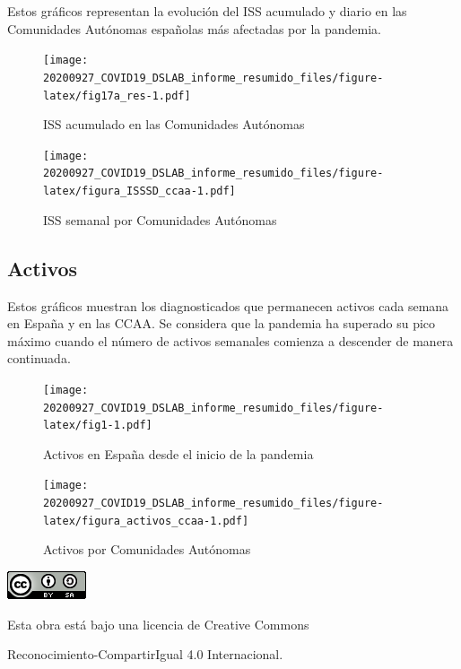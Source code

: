 \documentclass[
  11pt,
]{article}
\begin{document}
Estos gráficos representan la evolución del ISS acumulado y diario en
las Comunidades Autónomas españolas más afectadas por la pandemia.

\vspace{0.2cm}

\begin{figure}
\centering
\texttt{[image: 20200927\_COVID19\_DSLAB\_informe\_resumido\_files/figure-latex/fig17a\_res-1.pdf]}
\caption{\label{fig:fig17a_res} ISS acumulado en las Comunidades
Autónomas}
\end{figure}

\begin{figure}
\centering
\texttt{[image: 20200927\_COVID19\_DSLAB\_informe\_resumido\_files/figure-latex/figura\_ISSSD\_ccaa-1.pdf]}
\caption{\label{fig:figura_ISSSD_ccaa} ISS semanal por Comunidades
Autónomas}
\end{figure}

\clearpage

\hypertarget{activos}{%
\subsection{Activos}\label{activos}}

Estos gráficos muestran los diagnosticados que permanecen activos cada
semana en España y en las CCAA. Se considera que la pandemia ha superado
su pico máximo cuando el número de activos semanales comienza a
descender de manera continuada.

\vspace{0.2cm}

\begin{figure}
\centering
\texttt{[image: 20200927\_COVID19\_DSLAB\_informe\_resumido\_files/figure-latex/fig1-1.pdf]}
\caption{\label{fig:fig17a_res} Activos en España desde el inicio de la
pandemia}
\end{figure}

\begin{figure}
\centering
\texttt{[image: 20200927\_COVID19\_DSLAB\_informe\_resumido\_files/figure-latex/figura\_activos\_ccaa-1.pdf]}
\caption{\label{fig:figura_activos_ccaa} Activos por Comunidades
Autónomas}
\end{figure}

\begin{center}
\includegraphics{cc.png}
\end{center}

\vspace{0.2cm}

\begin{center}
Esta obra está bajo una licencia de Creative Commons 
\end{center}

\begin{center}
Reconocimiento-CompartirIgual 4.0 Internacional.
\end{center}
\end{document}
